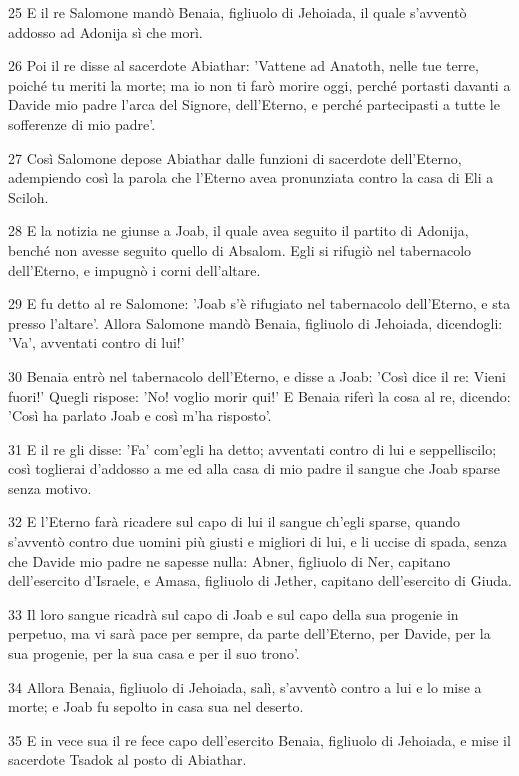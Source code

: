 \par 25 E il re Salomone mandò Benaia, figliuolo di Jehoiada, il quale s'avventò addosso ad Adonija sì che morì.
\par 26 Poi il re disse al sacerdote Abiathar: 'Vattene ad Anatoth, nelle tue terre, poiché tu meriti la morte; ma io non ti farò morire oggi, perché portasti davanti a Davide mio padre l'arca del Signore, dell'Eterno, e perché partecipasti a tutte le sofferenze di mio padre'.
\par 27 Così Salomone depose Abiathar dalle funzioni di sacerdote dell'Eterno, adempiendo così la parola che l'Eterno avea pronunziata contro la casa di Eli a Sciloh.
\par 28 E la notizia ne giunse a Joab, il quale avea seguito il partito di Adonija, benché non avesse seguito quello di Absalom. Egli si rifugiò nel tabernacolo dell'Eterno, e impugnò i corni dell'altare.
\par 29 E fu detto al re Salomone: 'Joab s'è rifugiato nel tabernacolo dell'Eterno, e sta presso l'altare'. Allora Salomone mandò Benaia, figliuolo di Jehoiada, dicendogli: 'Va', avventati contro di lui!'
\par 30 Benaia entrò nel tabernacolo dell'Eterno, e disse a Joab: 'Così dice il re: Vieni fuori!' Quegli rispose: 'No! voglio morir qui!' E Benaia riferì la cosa al re, dicendo: 'Così ha parlato Joab e così m'ha risposto'.
\par 31 E il re gli disse: 'Fa' com'egli ha detto; avventati contro di lui e seppelliscilo; così toglierai d'addosso a me ed alla casa di mio padre il sangue che Joab sparse senza motivo.
\par 32 E l'Eterno farà ricadere sul capo di lui il sangue ch'egli sparse, quando s'avventò contro due uomini più giusti e migliori di lui, e li uccise di spada, senza che Davide mio padre ne sapesse nulla: Abner, figliuolo di Ner, capitano dell'esercito d'Israele, e Amasa, figliuolo di Jether, capitano dell'esercito di Giuda.
\par 33 Il loro sangue ricadrà sul capo di Joab e sul capo della sua progenie in perpetuo, ma vi sarà pace per sempre, da parte dell'Eterno, per Davide, per la sua progenie, per la sua casa e per il suo trono'.
\par 34 Allora Benaia, figliuolo di Jehoiada, salì, s'avventò contro a lui e lo mise a morte; e Joab fu sepolto in casa sua nel deserto.
\par 35 E in vece sua il re fece capo dell'esercito Benaia, figliuolo di Jehoiada, e mise il sacerdote Tsadok al posto di Abiathar.
